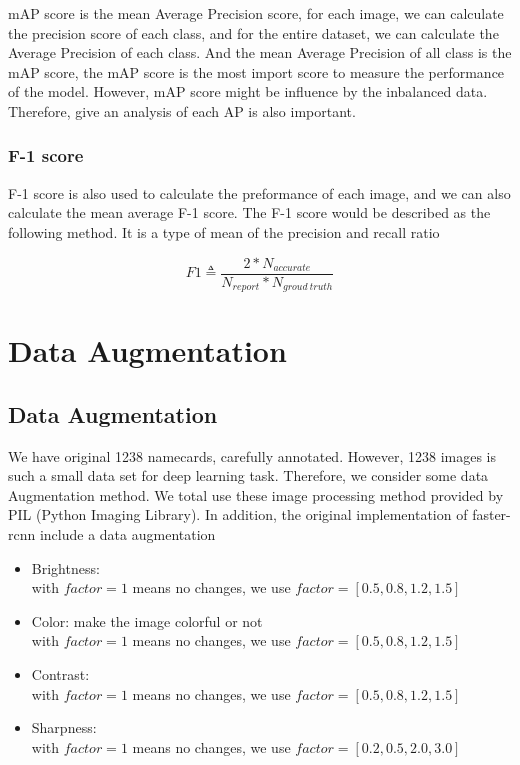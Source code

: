 \documentclass{IEEEtran}
\begin{document}
mAP score is the mean Average Precision score, for each image, we can calculate the precision score of each class, and for the entire 
dataset, we can calculate the Average Precision of each class. And the mean Average Precision of all class is the mAP score, the mAP 
score is the most import score to measure the performance of the model. However, mAP score might be influence by the inbalanced data.
Therefore, give an analysis of each AP is also important.

\subsubsection{F-1 score}
F-1 score is also used to calculate the preformance of each image, and we can also calculate the mean average F-1 score. The F-1 score
would be described as the following method. It is a type of mean of the precision and recall ratio

\begin{equation}
    F1 \triangleq \frac{2 * N_{accurate}}{N_{report}* N_{groud\ truth}}
\end{equation}

\section{Data Augmentation}
\subsection{Data Augmentation}
We have original 1238 namecards, carefully annotated. However, 1238 images is such a small data set for deep learning task. Therefore, we consider some data Augmentation method. We total use these image processing method provided by PIL (Python Imaging Library). In addition, the original implementation of faster-rcnn include a data augmentation 
\begin{itemize}
    \item{Brightness:\\
      with $factor = 1$ means no changes, we use $factor = [0.5,0.8,1.2,1.5]$
    }
    \item{Color: make the image colorful or not\\
      with $factor = 1$ means no changes, we use $factor = [0.5,0.8,1.2,1.5]$
    }
    \item{Contrast:\\
      with $factor = 1$ means no changes, we use $factor = [0.5,0.8,1.2,1.5]$
    }
    \item{Sharpness:\\
      with $factor = 1$ means no changes, we use $factor = [0.2,0.5,2.0,3.0]$
    }
\end{itemize}
\end{document}
